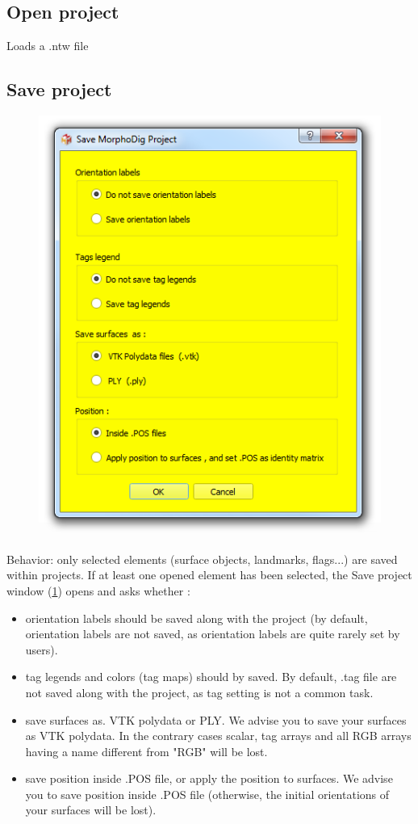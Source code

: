 \subsection{Open project}
Loads a .ntw file

\subsection{Save project}
\begin{figure}
  \centering  
 \includegraphics[scale=0.5]{images/07/project/save_ntw.png}
\label{save_project_file}
\end{figure}
Behavior: only selected elements (surface objects, landmarks, flags...) are saved within projects. If at least one opened element has been selected, the Save project window (\ref{save_project_file}) opens and asks whether :  
\begin{itemize}
\item orientation labels should be saved along with the project (by default, orientation labels are not saved, as orientation labels are quite rarely set by users). 
\item tag legends and colors (tag maps) should by saved. By default, .tag file are not saved along with the project, as tag setting is not a common task. 
\item save surfaces as. VTK polydata or PLY. We advise you to save your surfaces as VTK polydata. In the contrary cases scalar,  tag arrays and all RGB arrays having a name different from "RGB" will be lost.
\item save position inside .POS file, or apply the position to surfaces. We advise you to save position inside .POS file (otherwise, the initial orientations of your surfaces will be lost). 
\end{itemize}
